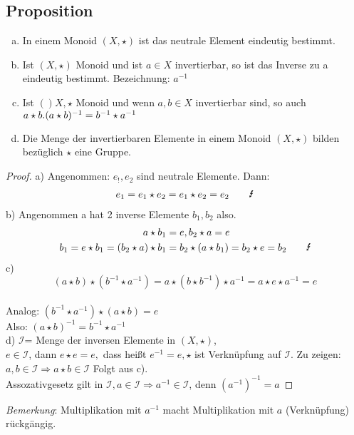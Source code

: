 \subsection{Proposition}\label{sec:1.5}
\begin{enumerate}[a)]
\item In einem Monoid $(X,\star)$ ist das neutrale Element eindeutig bestimmt.
\item Ist $(X,\star)$ Monoid und ist $a \in X$ invertierbar, so ist das Inverse zu a eindeutig bestimmt. Bezeichnung: $a^{-1}$
\item Ist $()X, \star$ Monoid und wenn $a,b \in X$ invertierbar sind, so auch $a \star b.\\
(a \star b)^{-1} = b^{-1} \star a^{-1}$
\item Die Menge der invertierbaren Elemente in einem Monoid $(X, \star)$ bilden bezüglich $\star$ eine Gruppe.
\end{enumerate}
\begin{proof}
a) Angenommen: $e_!,e_2$ sind neutrale Elemente. Dann:\\
\begin{align}
e_1 = e_1 \star e_2 = e_1 \star e_2 = e_2 \qquad{\text{\Lightning}}\notag
\end{align}
b) Angenommen a hat 2 inverse Elemente $b_1, b_2$ also.\\
\begin{align}
a \star b_1 &= e, b_2 \star a = e \notag\\
b_1 = e \star b_1 = (b_2 \star a) \star b_1 &= b_2 \star (a \star b_1) = b_2 \star e = b_2 \qquad \text{\Lightning} \notag
\end{align}
c) $$(a \star b)\star (b^{-1} \star a^{-1}) = a \star (b \star b^{-1}) \star a^{-1} = a \star e \star a^{-1} = e$$\\
Analog: $(b^{-1} \star a^{-1})\star (a \star b) =e $\\
Also: $(a \star b)^{-1} = b^{-1} \star a^{-1}$\\
d) $\mathcal{I}$= Menge der inversen Elemente in $(X, \star)$,\\ $e \in \mathcal{I}$, dann $e \star e = e,$ dass hei\ss t $e^{-1} = e, \star$ ist Verknüpfung auf $\mathcal{I}$.
Zu zeigen: $a,b \in \mathcal{I} \Rightarrow a \star b \in \mathcal{I}$ Folgt aus c).\\
Assozativgesetz gilt in $\mathcal{I}, a \in \mathcal{I} \Rightarrow a^{-1} \in \mathcal{I}$, denn $(a^{-1})^{-1} = a$
\end{proof}
\emph{Bemerkung}: Multiplikation mit $a^{-1}$ macht Multiplikation mit $a$ (Verknüpfung) rückgängig.
